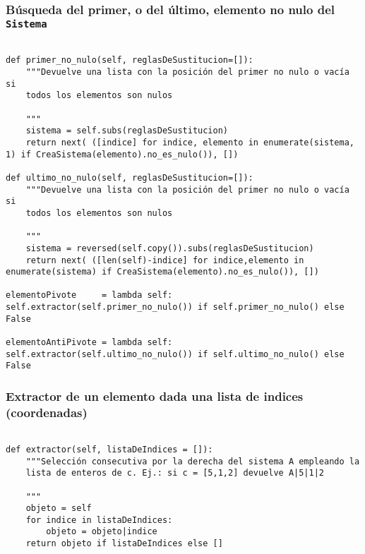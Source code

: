 \documentclass[11pt]{report}
\begin{document}
\subsubsection{Búsqueda del primer, o del último, elemento no nulo del \texttt{Sistema}}
\label{sec:org2303395}

\begin{verbatim}

def primer_no_nulo(self, reglasDeSustitucion=[]):
    """Devuelve una lista con la posición del primer no nulo o vacía si
    todos los elementos son nulos

    """
    sistema = self.subs(reglasDeSustitucion)
    return next( ([indice] for indice, elemento in enumerate(sistema, 1) if CreaSistema(elemento).no_es_nulo()), [])

def ultimo_no_nulo(self, reglasDeSustitucion=[]):
    """Devuelve una lista con la posición del primer no nulo o vacía si
    todos los elementos son nulos

    """
    sistema = reversed(self.copy()).subs(reglasDeSustitucion)
    return next( ([len(self)-indice] for indice,elemento in enumerate(sistema) if CreaSistema(elemento).no_es_nulo()), [])

elementoPivote     = lambda self:  self.extractor(self.primer_no_nulo()) if self.primer_no_nulo() else False

elementoAntiPivote = lambda self:  self.extractor(self.ultimo_no_nulo()) if self.ultimo_no_nulo() else False

\end{verbatim}

\subsubsection{Extractor de un elemento dada una lista de indices (coordenadas)}
\label{sec:orgc3bc1f9}

\begin{verbatim}

def extractor(self, listaDeIndices = []):
    """Selección consecutiva por la derecha del sistema A empleando la
    lista de enteros de c. Ej.: si c = [5,1,2] devuelve A|5|1|2

    """
    objeto = self
    for indice in listaDeIndices:
        objeto = objeto|indice
    return objeto if listaDeIndices else []

\end{verbatim}
\end{document}

